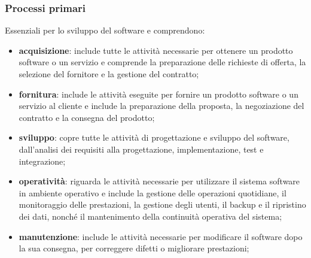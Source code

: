 \subsubsection{Processi primari}
Essenziali per lo sviluppo del software e comprendono:
\begin{itemize}
    \item \textbf{acquisizione}: include tutte le attività necessarie per ottenere un prodotto software o un servizio e comprende la preparazione delle richieste di offerta, la selezione del fornitore e la gestione del contratto;
    \item \textbf{fornitura}: include le attività eseguite per fornire un prodotto software o un servizio al cliente e include la preparazione della proposta, la negoziazione del contratto e la consegna del prodotto;
    \item \textbf{sviluppo}: copre tutte le attività di progettazione e sviluppo del software, dall'analisi dei requisiti alla progettazione, implementazione, test e integrazione;
    \item \textbf{operatività}: riguarda le attività necessarie per utilizzare il sistema software in ambiente operativo e include la gestione delle operazioni quotidiane, il monitoraggio delle prestazioni, la gestione degli utenti, il backup e il ripristino dei dati, nonché il mantenimento della continuità operativa del sistema;
    \item \textbf{manutenzione}: include le attività necessarie per modificare il software dopo la sua consegna, per correggere difetti o migliorare prestazioni;
\end{itemize}
